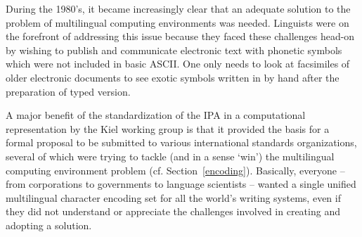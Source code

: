 During the 1980's, it became increasingly clear that an adequate solution 
to the problem of multilingual computing environments was needed. Linguists 
were on the forefront of addressing this issue because they faced these 
challenges head-on by wishing to publish and communicate electronic text 
with phonetic symbols which were not included in basic ASCII. One 
only needs to look at facsimiles of older electronic documents to see exotic 
symbols written in by hand after the preparation of typed version.




A major benefit of the standardization of the IPA in a computational
representation by the Kiel working group is that it provided the basis for a
formal proposal to be submitted to various international standards
organizations, several of which were trying to tackle (and in a sense `win') the
multilingual computing environment problem (cf. Section~\ref{encoding}).
Basically, everyone -- from corporations to governments to language scientists
-- wanted a single unified multilingual character encoding set for all the
world's writing systems, even if they did not understand or appreciate the
challenges involved in creating and adopting a solution.

